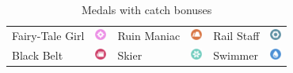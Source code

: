 \begin{table}[t]
\begin{tabular}{lc|lc|lc}
  Fairy-Tale Girl &\includegraphics[width=1em,keepaspectratio]{images/fairy.png} &
   Ruin Maniac &\includegraphics[width=1em,keepaspectratio]{images/ground.png} &
   Rail Staff &\includegraphics[width=1em,keepaspectratio]{images/steel.png} \\
  Black Belt & \includegraphics[width=1em,keepaspectratio]{images/fighting.png} &
   Skier & \includegraphics[width=1em,keepaspectratio]{images/ice.png} &
   Swimmer &\includegraphics[width=1em,keepaspectratio]{images/water.png}\\
\end{tabular}
  \caption{Medals with catch bonuses\label{table:medalcatch}}
\end{table}
\begingroup
\setlength{\tabcolsep}{1pt}
\footnotesize
